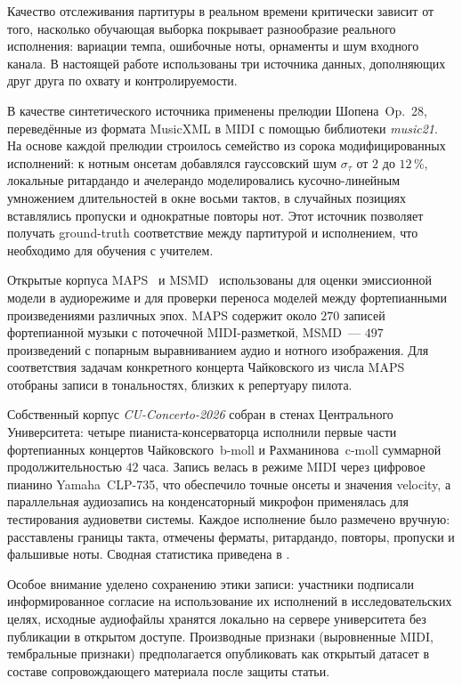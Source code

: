%
Качество отслеживания партитуры в реальном времени критически зависит
от того, насколько обучающая выборка покрывает разнообразие реального
исполнения: вариации темпа, ошибочные ноты, орнаменты и шум входного
канала. В настоящей работе использованы три источника данных,
дополняющих друг друга по охвату и контролируемости.

В качестве синтетического источника применены прелюдии Шопена~Op.~28,
переведённые из формата MusicXML в MIDI с помощью библиотеки
\textit{music21}. На основе каждой прелюдии строилось семейство из
сорока модифицированных исполнений: к нотным онсетам добавлялся
гауссовский шум $\sigma_\tau$ от $2$ до $12$\,\%, локальные
ритардандо и ачелерандо моделировались кусочно-линейным умножением
длительностей в окне восьми тактов, в случайных позициях вставлялись
пропуски и однократные повторы нот. Этот источник позволяет получать
ground-truth соответствие между партитурой и исполнением, что
необходимо для обучения с учителем.

Открытые корпуса MAPS~\cite{Mueller2007} и MSMD~\cite{Dorfer2018}
использованы для оценки эмиссионной модели в аудиорежиме и для
проверки переноса моделей между фортепианными произведениями
различных эпох. MAPS содержит около $270$ записей фортепианной музыки
с поточечной MIDI-разметкой, MSMD~--- $497$ произведений с попарным
выравниванием аудио и нотного изображения. Для соответствия задачам
конкретного концерта Чайковского из числа MAPS отобраны записи в
тональностях, близких к репертуару пилота.

Собственный корпус \textit{CU-Concerto-2026} собран в стенах
Центрального Университета: четыре пианиста-консерваторца исполнили
первые части фортепианных концертов Чайковского~b-moll и
Рахманинова~c-moll суммарной продолжительностью $42$ часа. Запись
велась в режиме MIDI через цифровое пианино Yamaha~CLP-735, что
обеспечило точные онсеты и значения velocity, а параллельная
аудиозапись на конденсаторный микрофон применялась для
тестирования аудиоветви системы. Каждое исполнение было размечено
вручную: расставлены границы такта, отмечены ферматы, ритардандо,
повторы, пропуски и фальшивые ноты. Сводная статистика приведена в
.

Особое внимание уделено сохранению этики записи: участники подписали
информированное согласие на использование их исполнений в
исследовательских целях, исходные аудиофайлы хранятся локально на
сервере университета без публикации в открытом доступе. Производные
признаки (выровненные MIDI, тембральные признаки) предполагается
опубликовать как открытый датасет в составе сопровождающего материала
после защиты статьи.

